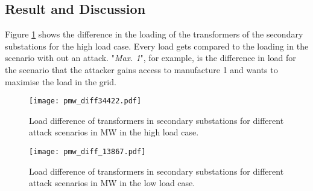 \subsection{Result and Discussion}
\label{subsec:result}

Figure \ref{fig:pmw_diff_high} shows the difference in the loading of the transformers of the secondary substations for the high load case.
Every load gets compared to the loading in the scenario with out an attack.
"\textit{Max. 1}", for example, is the difference in load for the scenario that the attacker gains access to manufacture 1 and wants to maximise the load in the grid.
\vspace*{-0.5cm} 
\begin{figure}[H]

	\centering
	\texttt{[image: pmw\_diff34422.pdf]}
    \vspace*{-0.3cm} 
	\caption{
		Load difference of transformers in secondary substations for different attack scenarios in MW in the high load case.
	}
	\label{fig:pmw_diff_high}
\end{figure}
\vspace*{-0.85cm} 
\begin{figure}[H]

	\centering
	\texttt{[image: pmw\_diff\_13867.pdf]}
    \vspace*{-0.3cm} 
	\caption{
		Load difference of transformers in secondary substations for different attack scenarios in MW in the low load case.
	}
	\label{fig:pmw_diff_low}
\end{figure}


